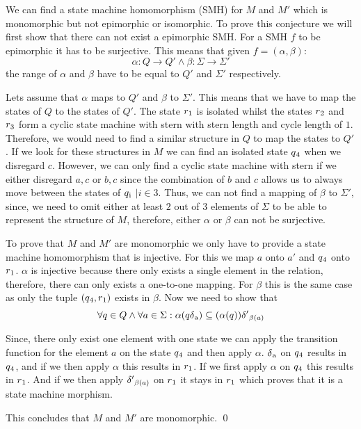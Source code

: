 \documentclass[a4paper,12pt,numbers=noenddot]{scrreport}
\begin{document}
We can find a state machine homomorphism (SMH) for $M$ and $M'$ which is monomorphic but not epimorphic or isomorphic. To prove this conjecture we will first show that there can not exist a epimorphic SMH. For a SMH $f$ to be epimorphic it has to be surjective.
This means that given $f=(\alpha, \beta)$:
\begin{equation}
    \alpha : Q \rightarrow Q' \land \beta : \Sigma \rightarrow \Sigma'
\end{equation}
the range of $\alpha$ and $\beta$ have to be equal to $Q'$ and $\Sigma'$ respectively.

Lets assume that $\alpha$ maps to $Q'$ and $\beta$ to $\Sigma'$. This means that we have to map the states of $Q$ to the states of $Q'$. The state $r\textsubscript{1}$ is isolated whilst the states $r\textsubscript{2}$ and $r\textsubscript{3}$ form a cyclic state machine with stern with stern length and cycle length of $1$. Therefore, we would need to find a similar structure in $Q$ to map the states to $Q'$. If we look for these structures in $M$ we can find an isolated state $q\textsubscript{4}$ when we disregard $c$. However, we can only find a cyclic state machine with stern if we either disregard $a,c$ or $b,c$ since the combination of $b$ and $c$ allows us to always move between the states of $q\textsubscript{i}$ $| i \in {3}$. Thus, we can not find a mapping of $\beta$ to $\Sigma'$, since, we need to omit either at least $2$ out of $3$ elements of $\Sigma$ to be able to represent the structure of $M$, therefore, either $\alpha$ or $\beta$ can not be surjective.

To prove that $M$ and $M'$ are monomorphic we only have to provide a state machine homomorphism that is injective. For this we map $a$ onto $a'$ and $q\textsubscript{4}$ onto $r\textsubscript{1}$. $\alpha$ is injective because there only exists a single element in the relation, therefore, there can only exists a one-to-one mapping. For $\beta$ this is the same case as only the tuple $(q\textsubscript{4}, r\textsubscript{1})$ exists in $\beta$. 
Now we need to show that
\begin{equation}
\forall q \in Q \land \forall a \in \Sigma : \alpha(q\delta\textsubscript{a}) \subseteq (\alpha(q))\delta'\textsubscript{$\beta(a)$}
\end{equation}

Since, there only exist one element with one state we can apply the transition function for the element $a$ on the state $q\textsubscript{4}$ and then apply $\alpha$. $\delta\textsubscript{a}$ on $q\textsubscript{4}$ results in $q\textsubscript{4}$, and if we then apply $\alpha$ this results in $r\textsubscript{1}$. If we first apply $\alpha$ on $q\textsubscript{4}$ this results in $r\textsubscript{1}$. And if we then apply $\delta'\textsubscript{$\beta(a)$}$ on $r\textsubscript{1}$ it stays in $r\textsubscript{1}$ which proves that it is a state machine morphism. 

This concludes that $M$ and $M'$ are monomorphic.
\qed
\end{document}
